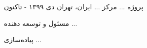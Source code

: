 

\begin{cventries}

  \cventry
    {پروژه ...} %
    {مرکز ...} %
    {ایران، تهران} %
    {دی ۱۳۹۹ - تاکنون} %
    {
      \begin{cvitems} %
        \item {مسئول و توسعه دهنده ...}
        \item {پیاده‌سازی ...}
      \end{cvitems}
    }
\end{cventries}
